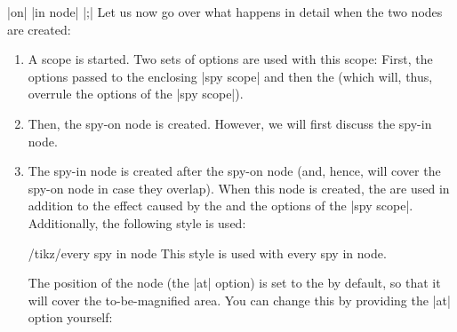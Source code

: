 \begin{command}{\spy {} |on| 
    |in node| |;|}
  Let us now go over what happens in detail when the two nodes are
  created: 
  \begin{enumerate}
  \item A scope is started. Two sets of options are used with this
    scope: First, the options passed to the enclosing |spy scope| and
    then the  (which will, thus, overrule the options of
    the |spy scope|).
  \item Then, the spy-on node is created. However, we will first
    discuss the spy-in node.
  \item The spy-in node is created after the spy-on node (and, hence,
    will cover the spy-on node in case they overlap). When this node is
    created, the  are used in addition to the 
    effect caused by the  and the options of the
    |{spy scope}|. Additionally, the following style is used:
    \begin{stylekey}{/tikz/every spy in node}
      This style is used with every spy in node.  
    \end{stylekey}
    The position of the node (the |at| option) is set to the
     by default, so that it will cover the
    to-be-magnified area. You can change this by providing the |at|
    option yourself:
\begin{codeexample}[]
\end{codeexample}
\end{enumerate}
\end{command}
